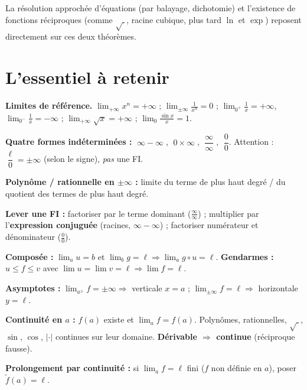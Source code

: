 \begin{remarque}
La résolution approchée d'équations (par balayage, dichotomie) et l'existence de fonctions réciproques (comme $\sqrt{\;}$, racine cubique, plus tard $\ln$ et $\exp$) reposent directement sur ces deux théorèmes.
\end{remarque}

\section{L'essentiel à retenir}

\begin{synthese}
\textbf{Limites de référence.} $\displaystyle\lim_{+\infty}x^{n}=+\infty$ ; $\displaystyle\lim_{\pm\infty}\frac1{x^{n}}=0$ ; $\displaystyle\lim_{0^{+}}\frac1x=+\infty$, $\displaystyle\lim_{0^{-}}\frac1x=-\infty$ ; $\displaystyle\lim_{+\infty}\sqrt x=+\infty$ ; $\displaystyle\lim_{0}\frac{\sin x}{x}=1$.

\smallskip
\textbf{Quatre formes indéterminées :} $\;\infty-\infty\;$, $\;0\times\infty\;$, $\;\dfrac{\infty}{\infty}\;$, $\;\dfrac00$. \quad Attention : $\dfrac{\ell}{0}=\pm\infty$ (selon le signe), \emph{pas} une FI.

\smallskip
\textbf{Polynôme / rationnelle en $\pm\infty$ :} limite du terme de plus haut degré / du quotient des termes de plus haut degré.

\smallskip
\textbf{Lever une FI :} factoriser par le terme dominant ($\tfrac{\infty}{\infty}$) ; multiplier par l'\textbf{expression conjuguée} (racines, $\infty-\infty$) ; factoriser numérateur et dénominateur ($\tfrac00$).

\smallskip
\textbf{Composée :} $\displaystyle\lim_{a}u=b$ et $\displaystyle\lim_{b}g=\ell\Rightarrow\lim_{a}g\circ u=\ell$. \quad
\textbf{Gendarmes :} $u\le f\le v$ avec $\lim u=\lim v=\ell\Rightarrow\lim f=\ell$.

\smallskip
\textbf{Asymptotes :} $\lim_{a^{\pm}}f=\pm\infty\Rightarrow$ verticale $x=a$ ; $\lim_{\pm\infty}f=\ell\Rightarrow$ horizontale $y=\ell$.

\smallskip
\textbf{Continuité en $a$ :} $f(a)$ existe et $\displaystyle\lim_{a}f=f(a)$. Polynômes, rationnelles, $\sqrt{\;}$, $\sin$, $\cos$, $|\cdot|$ continues sur leur domaine. \textbf{Dérivable $\Rightarrow$ continue} (réciproque fausse).

\smallskip
\textbf{Prolongement par continuité :} si $\displaystyle\lim_{a}f=\ell$ fini ($f$ non définie en $a$), poser $\tilde f(a)=\ell$.


\end{synthese}
